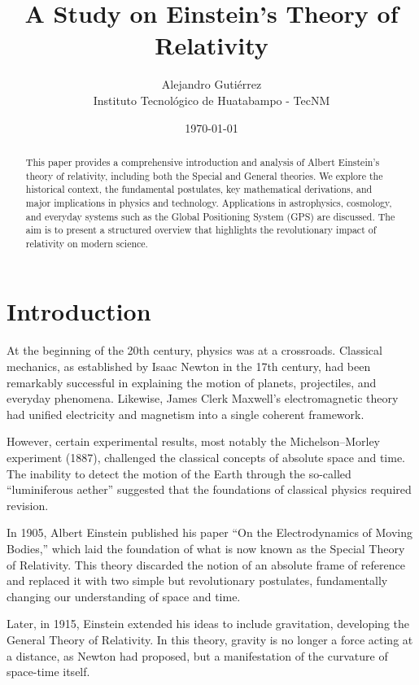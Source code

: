 \documentclass[12pt,a4paper]{article}
\title{A Study on Einstein's Theory of Relativity}
\author{Alejandro Gutiérrez \\ Instituto Tecnológico de Huatabampo - TecNM}
\date{\today}
\begin{document}
\maketitle

\begin{abstract}
  This paper provides a comprehensive introduction and analysis of Albert Einstein's theory of relativity, including both the Special and General theories.
  We explore the historical context, the fundamental postulates, key mathematical derivations, and major implications in physics and technology.
  Applications in astrophysics, cosmology, and everyday systems such as the Global Positioning System (GPS) are discussed.
  The aim is to present a structured overview that highlights the revolutionary impact of relativity on modern science.
\end{abstract}

\section{Introduction}

At the beginning of the 20th century, physics was at a crossroads.
Classical mechanics, as established by Isaac Newton in the 17th century,
had been remarkably successful in explaining the motion of planets,
projectiles, and everyday phenomena. Likewise, James Clerk Maxwell's
electromagnetic theory had unified electricity and magnetism into a
single coherent framework.

However, certain experimental results, most notably the Michelson–Morley
experiment (1887), challenged the classical concepts of absolute space
and time. The inability to detect the motion of the Earth through the
so-called ``luminiferous aether'' suggested that the foundations of
classical physics required revision.

In 1905, Albert Einstein published his paper ``On the Electrodynamics of
Moving Bodies,'' which laid the foundation of what is now known as the
Special Theory of Relativity. This theory discarded the notion of an
absolute frame of reference and replaced it with two simple but
revolutionary postulates, fundamentally changing our understanding of
space and time.

Later, in 1915, Einstein extended his ideas to include gravitation,
developing the General Theory of Relativity. In this theory, gravity is
no longer a force acting at a distance, as Newton had proposed, but a
manifestation of the curvature of space-time itself.
\end{document}
